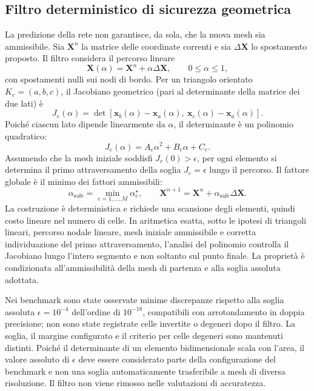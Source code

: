 \subsection{Filtro deterministico di sicurezza geometrica}

La predizione della rete non garantisce, da sola, che la nuova mesh sia ammissibile. Sia $\bm X^n$ la matrice delle coordinate correnti e sia $\Delta\bm X$ lo spostamento proposto. Il filtro considera il percorso lineare
\begin{equation}
\bm X(\alpha)=\bm X^n+\alpha\Delta\bm X,\qquad 0\leq\alpha\leq1,
\label{eq:mesh_path}
\end{equation}
con spostamenti nulli sui nodi di bordo. Per un triangolo orientato $K_e=(a,b,c)$, il Jacobiano geometrico (pari al determinante della matrice dei due lati) è
\begin{equation}
J_e(\alpha)=
\det\!\left[
\bm x_b(\alpha)-\bm x_a(\alpha),\
\bm x_c(\alpha)-\bm x_a(\alpha)
\right].
\end{equation}
Poiché ciascun lato dipende linearmente da $\alpha$, il determinante è un polinomio quadratico:
\begin{equation}
J_e(\alpha)=A_e\alpha^2+B_e\alpha+C_e.
\label{eq:jacobian_quadratic}
\end{equation}
Assumendo che la mesh iniziale soddisfi $J_e(0)>\epsilon$, per ogni elemento si determina il primo attraversamento della soglia $J_e=\epsilon$ lungo il percorso. Il fattore globale è il minimo dei fattori ammissibili:
\begin{equation}
\alpha_{\mathrm{safe}}=\min_{e=1,\ldots,M}\alpha_e^\star,
\qquad
\bm X^{n+1}=\bm X^n+\alpha_{\mathrm{safe}}\Delta\bm X.
\label{eq:safety_alpha}
\end{equation}
La costruzione è deterministica e richiede una scansione degli elementi, quindi costo lineare nel numero di celle. In aritmetica esatta, sotto le ipotesi di triangoli lineari, percorso nodale lineare, mesh iniziale ammissibile e corretta individuazione del primo attraversamento, l'analisi del polinomio controlla il Jacobiano lungo l'intero segmento e non soltanto sul punto finale. La proprietà è condizionata all'ammissibilità della mesh di partenza e alla soglia assoluta adottata.

Nei benchmark sono state osservate minime discrepanze rispetto alla soglia assoluta $\epsilon=10^{-4}$ dell'ordine di $10^{-18}$, compatibili con arrotondamento in doppia precisione; non sono state registrate celle invertite o degeneri dopo il filtro. La soglia, il margine configurato e il criterio per celle degeneri sono mantenuti distinti. Poiché il determinante di un elemento bidimensionale scala con l'area, il valore assoluto di $\epsilon$ deve essere considerato parte della configurazione del benchmark e non una soglia automaticamente trasferibile a mesh di diversa risoluzione. Il filtro non viene rimosso nelle valutazioni di accuratezza.

